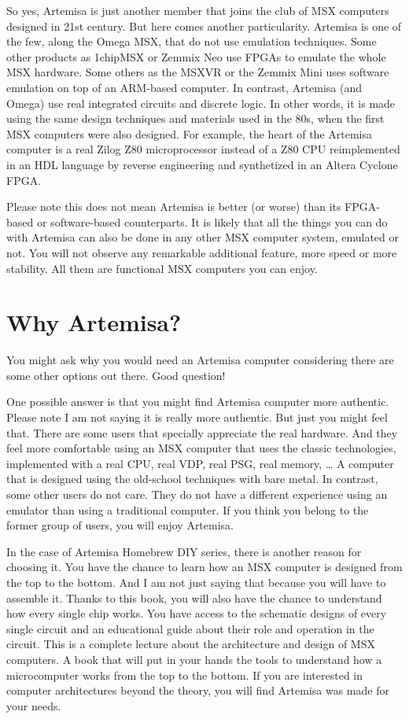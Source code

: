 So yes, Artemisa is just another member that joins the club of MSX computers designed in 21st century. But here comes another particularity. Artemisa is one of the few, along the Omega MSX, that do not use emulation techniques. Some other products as 1chipMSX or Zemmix Neo use FPGAs to emulate the whole MSX hardware. Some others as the MSXVR or the Zemmix Mini uses software emulation on top of an ARM-based computer. In contrast, Artemisa (and Omega) use real integrated circuits and discrete logic. In other words, it is made using the same design techniques and materials used in the 80s, when the first MSX computers were also designed. For example, the heart of the Artemisa computer is a real Zilog Z80 microprocessor instead of a Z80 CPU reimplemented in an HDL language by reverse engineering and synthetized in an Altera Cyclone FPGA.

Please note this does not mean Artemisa is better (or worse) than its FPGA-based or software-based counterparts. It is likely that all the things you can do with Artemisa can also be done in any other MSX computer system, emulated or not. You will not observe any remarkable additional feature, more speed or more stability. All them are functional MSX computers you can enjoy.

\section{Why Artemisa?}

You might ask why you would need an Artemisa computer considering there are some other options out there. Good question!

One possible answer is that you might find Artemisa computer more authentic. Please note I am not saying it is really more authentic. But just you might feel that. There are some users that specially appreciate the real hardware. And they feel more comfortable using an MSX computer that uses the classic technologies, implemented with a real CPU, real VDP, real PSG, real memory, … A computer that is designed using the old-school techniques with bare metal. In contrast, some other users do not care. They do not have a different experience using an emulator than using a traditional computer. If you think you belong to the former group of users, you will enjoy Artemisa. 

In the case of Artemisa Homebrew DIY series, there is another reason for choosing it. You have the chance to learn how an MSX computer is designed from the top to the bottom. And I am not just saying that because you will have to assemble it. Thanks to this book, you will also have the chance to understand how every single chip works. You have access to the schematic designs of every single circuit and an educational guide about their role and operation in the circuit. This is a complete lecture about the architecture and design of MSX computers. A book that will put in your hands the tools to understand how a microcomputer works from the top to the bottom. If you are interested in computer architectures beyond the theory, you will find Artemisa was made for your needs. 

